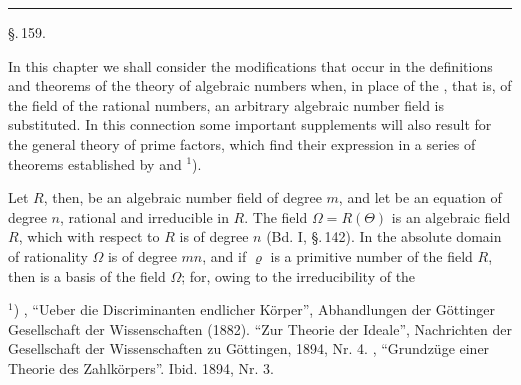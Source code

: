 \begin{center}


\rule{0.2\linewidth}{0.4pt}

\S.\,159.

\end{center}

In this chapter we shall consider the modifications that occur in the definitions and theorems of the theory of algebraic numbers when, in place of the , that is, of the field of the rational numbers, an arbitrary algebraic number field is substituted. In this connection some important supplements will also result for the general theory of prime factors, which find their expression in a series of theorems established by  and ${}^{1}$).

Let $R$, then, be an algebraic number field of degree $m$, and let
be an equation of degree $n$, rational and irreducible in $R$. The field $\Omega = R(\Theta)$ is an algebraic field  $R$, which with respect to $R$ is of degree $n$ (Bd. I, \S.\,142). In the absolute domain of rationality $\Omega$ is of degree $mn$, and if $\varrho$ is a primitive number of the field $R$, then
is a basis of the field $\Omega$; for, owing to the irreducibility of the

${}^{1}$) , ``Ueber die Discriminanten endlicher K\"orper'', Abhandlungen der G\"ottinger Gesellschaft der Wissenschaften (1882). ``Zur Theorie der Ideale'', Nachrichten der Gesellschaft der Wissenschaften zu G\"ottingen, 1894, Nr. 4. , ``Grundz\"uge einer Theorie des  Zahlk\"orpers''. Ibid. 1894, Nr. 3.
